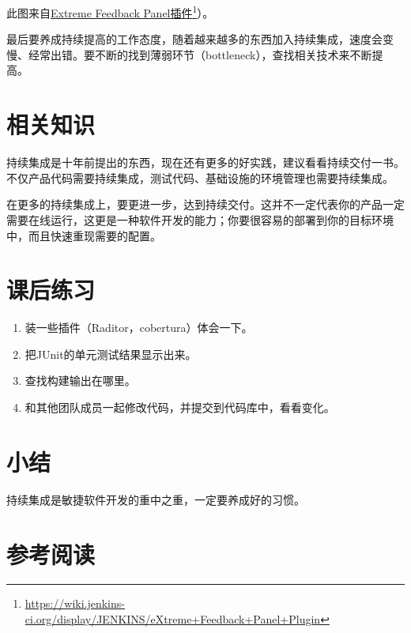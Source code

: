 此图来自\href{https://wiki.jenkins-ci.org/display/JENKINS/eXtreme+Feedback+Panel+Plugin}{Extreme Feedback Panel插件}\footnote{\href{https://wiki.jenkins-ci.org/display/JENKINS/eXtreme+Feedback+Panel+Plugin}{https:/\slash wiki.jenkins-ci.org\slash display\slash JENKINS\slash eXtreme+Feedback+Panel+Plugin}}）。

最后要养成持续提高的工作态度，随着越来越多的东西加入持续集成，速度会变慢、经常出错。要不断的找到薄弱环节（bottleneck），查找相关技术来不断提高。

\section{相关知识}
\label{相关知识}

持续集成是十年前提出的东西，现在还有更多的好实践，建议看看持续交付一书。不仅产品代码需要持续集成，测试代码、基础设施的环境管理也需要持续集成。

在更多的持续集成上，要更进一步，达到持续交付。这并不一定代表你的产品一定需要在线运行，这更是一种软件开发的能力；你要很容易的部署到你的目标环境中，而且快速重现需要的配置。

\section{课后练习}
\label{课后练习}

\begin{enumerate}
\item 装一些插件（Raditor，cobertura）体会一下。

\item 把JUnit的单元测试结果显示出来。

\item 查找构建输出在哪里。

\item 和其他团队成员一起修改代码，并提交到代码库中，看看变化。

\end{enumerate}

\section{小结}
\label{小结}

持续集成是敏捷软件开发的重中之重，一定要养成好的习惯。

\section{参考阅读}
\label{参考阅读}

